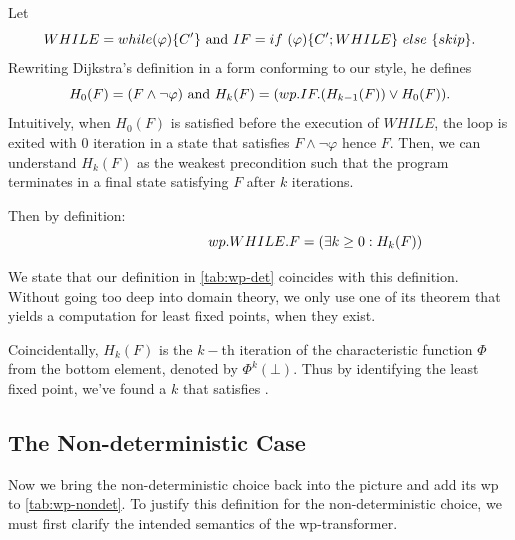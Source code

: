 Let 
\[
WHILE=while(\varphi)\{C'\}
\\\text{ and } \\ 
IF=  if\ (\varphi)\{C';WHILE\}\ else\ \{skip\}. 
\] 
Rewriting Dijkstra's definition in a form conforming to our style, he defines 
\[
H_0(F)=(F \wedge \neg \varphi )
\\\text{ and } \\ 
H_k(F)=(wp.IF.(H_{k-1}(F)) \vee H_0(F)). 
\]
Intuitively, when $H_0(F)$ is satisfied before the execution of $WHILE$, the loop is exited with 0 iteration in a state that satisfies $F\wedge\neg\varphi$ hence $F$. 
Then, we can understand $H_k(F)$ as the weakest precondition such that the program terminates in a final state satisfying $F$ after  $k$ iterations. 

Then by definition: 
\begin{equation}
\hspace{2.8cm} wp.WHILE.F=(\exists k\geq 0: H_k(F))  \label{eq:while}
\end{equation}



We state that our definition in \autoref{tab:wp-det} coincides with this definition. 
Without going too deep into domain theory, we only use one of its theorem that yields a computation for least fixed points, when they exist. 

\begin{theorem}
\end{theorem}


Coincidentally, $H_k(F)$ is the $k-$th iteration of the characteristic function $\Phi$ from the bottom element, denoted by $\Phi^k(\bot)$. 
Thus by identifying the least fixed point, we've found a $k$ that satisfies . 




\subsection{The Non-deterministic Case}\label{sec:wp-nondet}
Now we bring the non-deterministic choice back into the picture and add its wp to \autoref{tab:wp-nondet}. 
To justify this definition for the non-deterministic choice, we must first clarify the intended semantics of the wp-transformer. 

